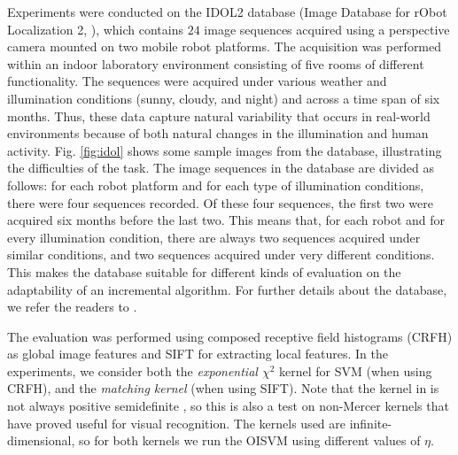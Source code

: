 Experiments were conducted on the IDOL2 database (Image Database for
rObot Localization 2, \cite{luo:idol2}), which contains $24$ image
sequences acquired using a perspective camera mounted on two mobile
robot platforms. The acquisition was performed within an indoor
laboratory environment consisting of five rooms of different
functionality. The sequences were acquired under various weather and
illumination conditions (sunny, cloudy, and night) and across a time
span of six months. Thus, these data capture natural variability that
occurs in real-world environments because of both natural changes in
the illumination and human activity. Fig. \ref{fig:idol} shows some
sample images from the database, illustrating the difficulties of the
task.  The image sequences in the database are divided as follows: for
each robot platform and for each type of illumination conditions,
there were four sequences recorded. Of these four sequences, the first
two were acquired six months before the last two. This means that, for
each robot and for every illumination condition, there are always two
sequences acquired under similar conditions, and two sequences
acquired under very different conditions. This makes the database
suitable for different kinds of evaluation on the adaptability of an
incremental algorithm. For further details about the database, we
refer the readers to \cite{luo:idol2}.

The evaluation was performed using composed receptive field histograms
(CRFH) \cite{linde:icpr04} as global image features and SIFT
\cite{Lowe99} for extracting local features. In the experiments, we
consider both the \emph{exponential $\chi^2$} kernel for SVM (when
using CRFH), and the \emph{matching kernel} \cite{WallravenCG03} (when
using SIFT). Note that the kernel in \cite{WallravenCG03} is not
always positive semidefinite \cite{BoughorbelTF04}, so this is also a
test on non-Mercer kernels that have proved useful for visual
recognition. The kernels used are infinite-dimensional, so for both
kernels we run the OISVM using different values of $\eta$.

